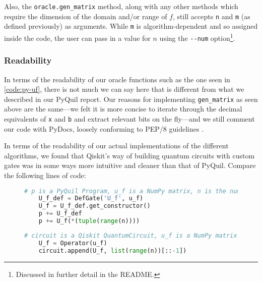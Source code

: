 \documentclass[12pt]{article}
\begin{document}
Also, the \texttt{oracle.gen\_matrix} method, along with any other methods which require the dimension of the domain and/or range of $f$, still accepts \texttt{n} and \texttt{m} (as defined previously) as arguments.
While \texttt{m} is algorithm-dependent and so assigned inside the code, the user can pass in a value for $n$ using the \texttt{-{}-num} option\footnote{Discussed in further detail in the README.}.


\subsubsection{Readability}

In terms of the readability of our oracle functions such as the one seen in \autoref{code:py-uf}, there is not much we can say here that is different from what we described in our PyQuil report.
Our reasons for implementing \texttt{gen\_matrix} as seen above are the same---we felt it is more concise to iterate through the decimal equivalents of \texttt{x} and \texttt{b} and extract relevant bits on the fly---and we still comment our code with PyDocs, loosely conforming to PEP/8 guidelines \cite{pep8}.

In terms of the readability of our actual implementations of the different algorithms, we found that Qiskit's way of building quantum circuits with custom gates was in some ways more intuitive and cleaner than that of PyQuil.
Compare the following lines of code:
\begin{figure}[h]
    \centering
    \begin{lstlisting}[numbers=none, language=Python]
    # p is a PyQuil Program, u_f is a NumPy matrix, n is the number of qubits
    U_f_def = DefGate('U_f', u_f)
    U_f = U_f_def.get_constructor()
    p += U_f_def
    p += U_f(*(tuple(range(n))))
\end{lstlisting}
    \label{code:#2}
\end{figure}
\begin{figure}[h]
    \centering
    \begin{lstlisting}[numbers=none, language=Python]
    # circuit is a Qiskit QuantumCircuit, u_f is a NumPy matrix, n is the number of qubits
    U_f = Operator(u_f)
    circuit.append(U_f, list(range(n))[::-1])
\end{lstlisting}
    \label{code:#2}
\end{figure}
\end{document}
